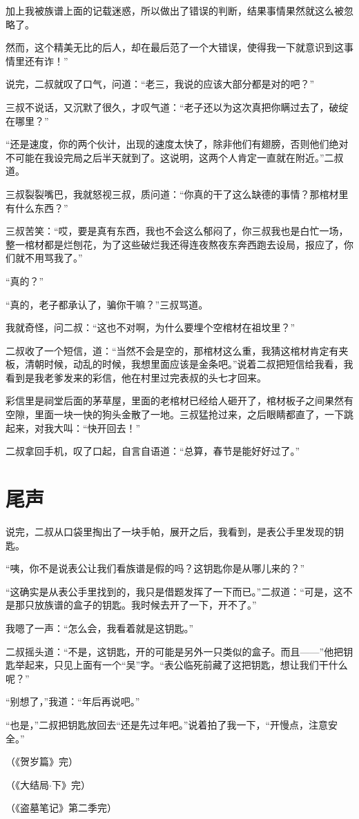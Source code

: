 加上我被族谱上面的记载迷惑，所以做出了错误的判断，结果事情果然就这么被忽略了。

然而，这个精美无比的后人，却在最后范了一个大错误，使得我一下就意识到这事情里还有诈！”

说完，二叔就叹了口气，问道：“老三，我说的应该大部分都是对的吧？”

三叔不说话，又沉默了很久，才叹气道：“老子还以为这次真把你瞒过去了，破绽在哪里？”

“还是速度，你的两个伙计，出现的速度太快了，除非他们有翅膀，否则他们绝对不可能在我设完局之后半天就到了。这说明，这两个人肯定一直就在附近。”二叔道。

三叔裂裂嘴巴，我就怒视三叔，质问道：“你真的干了这么缺德的事情？那棺材里有什么东西？”

三叔苦笑：“哎，要是真有东西，我也不会这么郁闷了，你三叔我也是白忙一场，整一棺材都是烂刨花，为了这些破烂我还得连夜熬夜东奔西跑去设局，报应了，你们就不用骂我了。”

“真的？”

“真的，老子都承认了，骗你干嘛？”三叔骂道。

我就奇怪，问二叔：“这也不对啊，为什么要埋个空棺材在祖坟里？”

二叔收了一个短信，道：“当然不会是空的，那棺材这么重，我猜这棺材肯定有夹板，清朝时候，动乱的时候，我想里面应该是金条吧。”说着二叔把短信给我看，我看到是我老爹发来的彩信，他在村里过完表叔的头七才回来。

彩信里是祠堂后面的茅草屋，里面的老棺材已经给人砸开了，棺材板子之间果然有空隙，里面一块一快的狗头金散了一地。三叔猛抢过来，之后眼睛都直了，一下跳起来，对我大叫：“快开回去！”

二叔拿回手机，叹了口起，自言自语道：“总算，春节是能好好过了。”

\chapter{尾声}

说完，二叔从口袋里掏出了一块手帕，展开之后，我看到，是表公手里发现的钥匙。

“咦，你不是说表公让我们看族谱是假的吗？这钥匙你是从哪儿来的？”

“这确实是从表公手里找到的，我只是借题发挥了一下而已。”二叔道：“可是，这不是那只放族谱的盒子的钥匙。我时候去开了一下，开不了。”

我嗯了一声：“怎么会，我看着就是这钥匙。”

二叔摇头道：“不是，这钥匙，开的可能是另外一只类似的盒子。而且——”他把钥匙举起来，只见上面有一个“吴”字。“表公临死前藏了这把钥匙，想让我们干什么呢？”

“别想了，”我道：“年后再说吧。”

“也是，”二叔把钥匙放回去“还是先过年吧。”说着拍了我一下，“开慢点，注意安全。”

{\fzqiti\hfill （《贺岁篇》完）}

{\fzqiti\hfill （《大结局$\cdot$下》完）}

{\fzqiti\hfill （《盗墓笔记》第二季完）}
